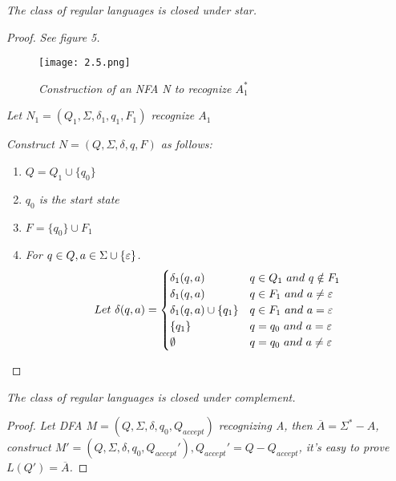 \documentclass{article}
\begin{document}
\newpage
\begin{thm}
    \textit{The class of regular languages is closed under star.}
    \begin{proof}
        \textit{See figure 5.}
        \begin{figure}
            \centering
            \texttt{[image: 2.5.png]}
            \caption{\textit{Construction of an NFA N to recognize $A_1^*$}}
        \end{figure}
        \textit{Let $N_1 = (Q_1,\Sigma,\delta_1,q_1,F_1)$ recognize $A_1$}

        \textit{Construct $N = (Q,\Sigma,\delta,q,F)$ as follows:}

        \begin{enumerate}
            \item $Q = Q_1\cup \{q_0\}$
            \item \textit{$q_0$ is the start state}
            \item $F = \{q_0\}\cup F_1$
            \item \textit{For $q\in Q,a\in \Sigma\cup\{\varepsilon\}$.}
            \[ 
                Let ~ \delta(q,a) = 
                \begin{cases}
                    \delta_1(q,a) & q\in Q_1~and~q\notin F_1 \\
                    \delta_1(q,a) & q\in F_1~and~a\neq\varepsilon \\
                    \delta_1(q,a)\cup\{q_1\} & q\in F_1~and~a=\varepsilon \\
                    \{q_1\} & q = q_0 ~ and ~ a = \varepsilon \\
                    \emptyset & q = q_0 ~ and ~ a \neq \varepsilon \\
                \end{cases}
            \]
        \end{enumerate}
    \end{proof}
\end{thm}

\begin{thm}
    \textit{The class of regular languages is closed under complement.}
    \begin{proof}
        \textit{Let DFA $M = (Q,\Sigma,\delta,q_0,Q_{accept})$ recognizing A, then $\overline{A} = \Sigma^*-A$,\\ construct $M' = (Q,\Sigma,\delta,q_0,Q_{accept}'),Q_{accept}' = Q - Q_{accept}$, it's easy to prove $L(Q') = \overline{A}$.}
    \end{proof}
\end{thm}
\end{document}
